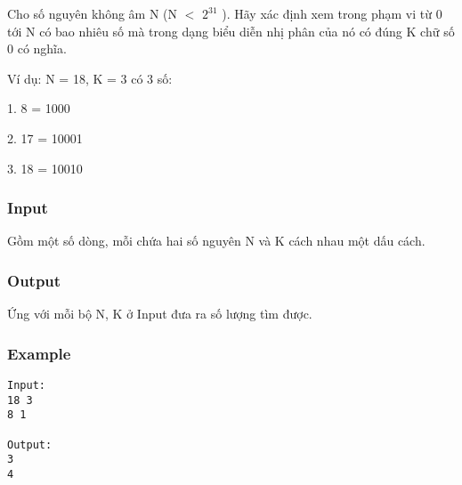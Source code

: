 



   Cho số nguyên không âm N (N $<$ $2^{31}$   ). Hãy xác định xem trong phạm vi từ 0 tới N có bao nhiêu số mà trong dạng biểu diễn nhị phân của nó có đúng K chữ số 0 có nghĩa.  

   Ví dụ: N = 18, K = 3 có 3 số:  

   1. 8 = 1000  

   2. 17 = 10001  

   3. 18 = 10010  

\subsubsection{   Input  }

   Gồm một số dòng, mỗi chứa hai số nguyên N và K cách nhau một dấu cách.  

\subsubsection{   Output  }

   Ứng với mỗi bộ N, K ở Input đưa ra số lượng tìm được.  

\subsubsection{   Example  }
\begin{verbatim}
Input:
18 3
8 1

Output:
3
4

\end{verbatim}
